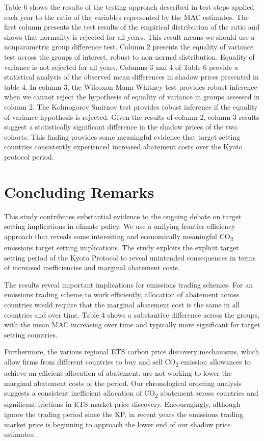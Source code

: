 \documentclass[
  10pt,
]{article}
\begin{document}
Table 6 shows the results of the testing approach described in test
steps applied each year to the ratio of the variables represented by the
MAC estimates. The first column presents the test results of the
empirical distribution of the ratio and shows that normality is rejected
for all years. This result means we should use a nonparametric group
difference test. Column 2 presents the equality of variance test across
the groups of interest, robust to non-normal distribution. Equality of
variance is not rejected for all years. Columns 3 and 4 of Table 6
provide a statistical analysis of the observed mean differences in
shadow prices presented in table 4. In column 3, the Wilcoxon Mann
Whitney test provides robust inference when we cannot reject the
hypothesis of equality of variance in groups assessed in column 2. The
Kolmogorov Smirnov test provides robust inference if the equality of
variance hypothesis is rejected. Given the results of column 2, column 3
results suggest a statistically significant difference in the shadow
prices of the two cohorts. This finding provides some meaningful
evidence that target setting countries consistently experienced
increased abatement costs over the Kyoto protocol period.

\hypertarget{concluding-remarks}{%
\section{Concluding Remarks}\label{concluding-remarks}}

This study contributes substantial evidence to the ongoing debate on target
setting implications in climate policy. We use a unifying frontier
efficiency approach that reveals some interesting and economically
meaningful CO\textsubscript{2} emissions target setting implications.
The study exploits the explicit target setting period of the Kyoto
Protocol to reveal unintended consequences in terms of increased
inefficiencies and marginal abatement costs.

The results reveal important implications for emissions trading schemes.
For an emissions trading scheme to work efficiently, allocation of
abatement across countries would require that the marginal abatement
cost is the same in all countries and over time. Table 4 shows a
substantive difference across the groups, with the mean MAC increasing
over time and typically more significant for target setting countries.

Furthermore, the various regional ETS carbon price discovery mechanisms,
which allow firms from different countries to buy and sell
CO\textsubscript{2} emission allowances to achieve an efficient
allocation of abatement, are not working to lower the marginal abatement
costs of the period. Our chronological ordering analysis suggests a
consistent inefficient allocation of CO\textsubscript{2} abatement
across countries and significant frictions in ETS market price
discovery. Encouragingly, although ignore the trading period since the KP, in recent years the emissions trading market
price is beginning to approach the lower end of our shadow price
estimates.
\end{document}
